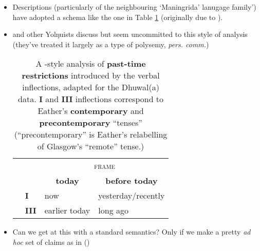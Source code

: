 \documentclass[11pt]{article}
\begin{document}
\begin{itemize}
\begin{figure}[H]
\end{figure}
	
	
	\item Descriptions (particularly of the neighbouring `Maningrida' lanugage family') have adopted a schema like the one in Table \ref{GlaswegianTR} (originally due to \citet{Glasgow1964}).
	\item \citet{Wilkinson1991} and other Yolŋuists discuss but seem uncommitted to this style of analysis (they've treated it largely as a type of polysemy, \textit{pers. comm.})
	
	\begin{table}[H]\centering\onehalfspacing
		\begin{tabular}{@{}llll@{}}\toprule
			
			&                 & \multicolumn{2}{c}{\textsc{frame}}          \\ 
			&                 & \multicolumn{1}{c}{\textbf{today}}         & \multicolumn{1}{c}{\textbf{before today}}      \\\midrule
			\multirow{2}{*}{\textsc{\rotatebox[origin=c]{90}{infl}}} & \textbf{\phantom{I}I}    & now           & yesterday/recently \\
			& \textbf{III} & earlier today & long ago           \\ \bottomrule%
		\end{tabular}
		\caption{A \citet{Glasgow1964}-style analysis of \textbf{past-time restrictions} introduced by the verbal inflections, adapted for the Dhuwal(a) data. \textbf{I} and \textbf{III} inflections correspond to Eather's \textbf{contemporary} and \textbf{precontemporary} ``tenses'' (``precontemporary'' is Eather's \citeyearpar[166]{Eather2011} relabelling of Glasgow's ``remote'' tense.)}\label{GlaswegianTR}
	\end{table}
	





\item Can we get at this with a standard semantics? Only if we make a pretty \textit{ad hoc} set of claims as in  (\nextx)


\end{itemize}
\end{document}
